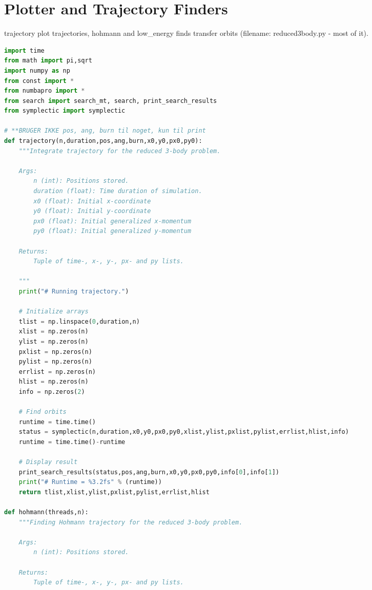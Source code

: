 \section{Plotter and Trajectory Finders} \label{app:code-plotter-trajectory}
trajectory plot trajectories, hohmann and low\_energy finds transfer orbits (filename: reduced3body.py - most of it).

\begin{adjustwidth*}{0cm}{-0.4cm}
\begin{lstlisting}[language=Python]
import time
from math import pi,sqrt
import numpy as np
from const import *
from numbapro import *
from search import search_mt, search, print_search_results
from symplectic import symplectic

# **BRUGER IKKE pos, ang, burn til noget, kun til print
def trajectory(n,duration,pos,ang,burn,x0,y0,px0,py0):
    """Integrate trajectory for the reduced 3-body problem.

    Args:
        n (int): Positions stored.
        duration (float): Time duration of simulation.
        x0 (float): Initial x-coordinate
        y0 (float): Initial y-coordinate
        px0 (float): Initial generalized x-momentum
        py0 (float): Initial generalized y-momentum

    Returns:
        Tuple of time-, x-, y-, px- and py lists.
    
    """
    print("# Running trajectory.")

    # Initialize arrays
    tlist = np.linspace(0,duration,n)
    xlist = np.zeros(n)
    ylist = np.zeros(n)
    pxlist = np.zeros(n)
    pylist = np.zeros(n)
    errlist = np.zeros(n)
    hlist = np.zeros(n)
    info = np.zeros(2)

    # Find orbits
    runtime = time.time()
    status = symplectic(n,duration,x0,y0,px0,py0,xlist,ylist,pxlist,pylist,errlist,hlist,info)
    runtime = time.time()-runtime

    # Display result
    print_search_results(status,pos,ang,burn,x0,y0,px0,py0,info[0],info[1])
    print("# Runtime = %3.2fs" % (runtime))
    return tlist,xlist,ylist,pxlist,pylist,errlist,hlist

def hohmann(threads,n):
    """Finding Hohmann trajectory for the reduced 3-body problem.

    Args:
        n (int): Positions stored.

    Returns:
        Tuple of time-, x-, y-, px- and py lists.
    

\end{lstlisting}
\end{adjustwidth*}
